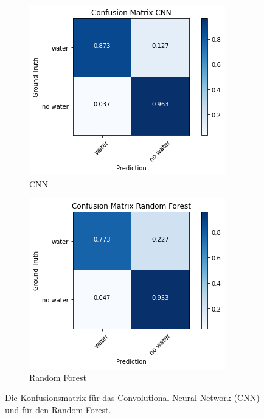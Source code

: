 \begin{figure}
    \centering
    \begin{subfigure}{0.4\textwidth}
        \centering
        \includegraphics[width=\textwidth]{content/img/confusion_cnn.png}
        \caption{CNN}
    \end{subfigure}
    \begin{subfigure}{0.4\textwidth}
        \centering
        \includegraphics[width=\textwidth]{content/img/confusion_forest.png}
        \caption{Random Forest}
    \end{subfigure}
    \caption{Die Konfusionsmatrix für das Convolutional Neural Network (CNN) und für den Random Forest.}
    \label{fig:confusion}
\end{figure}
